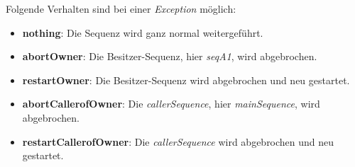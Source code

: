 Folgende Verhalten sind bei einer \textit{Exception} möglich:
\begin{itemize}
\item \textbf{nothing}: Die Sequenz wird ganz normal weitergeführt.
\item \textbf{abortOwner}: Die Besitzer-Sequenz, hier \textit{seqA1}, wird abgebrochen.
\item \textbf{restartOwner}: Die Besitzer-Sequenz wird abgebrochen und neu gestartet.
\item \textbf{abortCallerofOwner}: Die \textit{callerSequence}, hier \textit{mainSequence}, wird abgebrochen.
\item \textbf{restartCallerofOwner}: Die \textit{callerSequence} wird abgebrochen und neu gestartet.
\end{itemize}